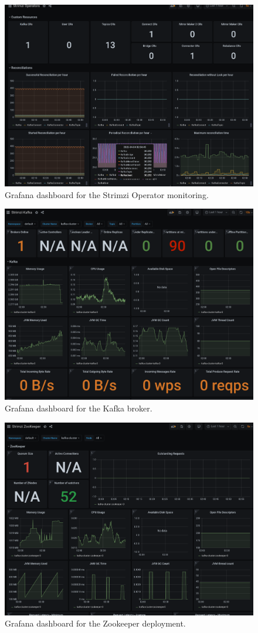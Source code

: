 \begin{figure}[H]
	\centering
	\includegraphics[width=1\linewidth]{figures/strimzi_op_dashb.png}
	\caption{Grafana dashboard for the Strimzi Operator monitoring.}
	\label{fig:strimzi_op_dashb}
\end{figure}
\begin{figure}[H]
	\centering
	\includegraphics[width=0.8\linewidth]{figures/strimzi_kafak_dashb.png}
	\caption{Grafana dashboard for the Kafka broker.}
	\label{fig:strimzi_kafka_dashb}
\end{figure}
\begin{figure}[H]
	\centering
	\includegraphics[width=0.8\linewidth]{figures/strimzi_zookeeper_dashb.png}
	\caption{Grafana dashboard for the Zookeeper deployment.}
	\label{fig:strimzi_zookeeper_dashb}
\end{figure}
